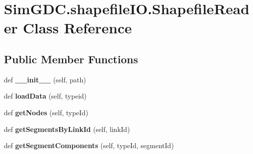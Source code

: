 \hypertarget{class_sim_g_d_c_1_1shapefile_i_o_1_1_shapefile_reader}{}\section{Sim\+G\+D\+C.\+shapefile\+I\+O.\+Shapefile\+Reader Class Reference}
\label{class_sim_g_d_c_1_1shapefile_i_o_1_1_shapefile_reader}
\subsection*{Public Member Functions}
\begin{DoxyCompactItemize}
\item 
\hypertarget{class_sim_g_d_c_1_1shapefile_i_o_1_1_shapefile_reader_a4ac8c5604c3c9f3b6ead3e67996ca77f}{}def {\bfseries \+\_\+\+\_\+init\+\_\+\+\_\+} (self, path)\label{class_sim_g_d_c_1_1shapefile_i_o_1_1_shapefile_reader_a4ac8c5604c3c9f3b6ead3e67996ca77f}

\item 
\hypertarget{class_sim_g_d_c_1_1shapefile_i_o_1_1_shapefile_reader_ad69dd3eac5e87f5260d5e3c53c17aebc}{}def {\bfseries load\+Data} (self, typeid)\label{class_sim_g_d_c_1_1shapefile_i_o_1_1_shapefile_reader_ad69dd3eac5e87f5260d5e3c53c17aebc}

\item 
\hypertarget{class_sim_g_d_c_1_1shapefile_i_o_1_1_shapefile_reader_a8e15a35f330665afb7f75670a51b472c}{}def {\bfseries get\+Nodes} (self, type\+Id)\label{class_sim_g_d_c_1_1shapefile_i_o_1_1_shapefile_reader_a8e15a35f330665afb7f75670a51b472c}

\item 
\hypertarget{class_sim_g_d_c_1_1shapefile_i_o_1_1_shapefile_reader_a7a92357d019f1635e39e4a2e2828354b}{}def {\bfseries get\+Segments\+By\+Link\+Id} (self, link\+Id)\label{class_sim_g_d_c_1_1shapefile_i_o_1_1_shapefile_reader_a7a92357d019f1635e39e4a2e2828354b}

\item 
\hypertarget{class_sim_g_d_c_1_1shapefile_i_o_1_1_shapefile_reader_a53512a2289e336f116b4d113b0f5d5fe}{}def {\bfseries get\+Segment\+Components} (self, type\+Id, segment\+Id)\label{class_sim_g_d_c_1_1shapefile_i_o_1_1_shapefile_reader_a53512a2289e336f116b4d113b0f5d5fe}

\end{DoxyCompactItemize}
